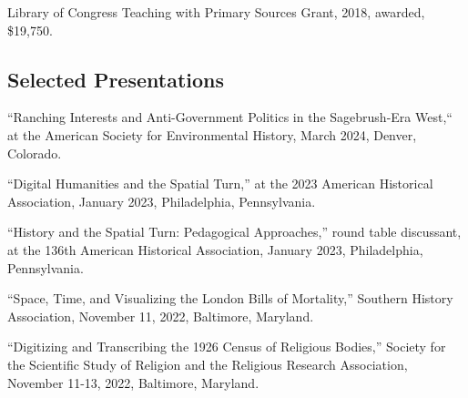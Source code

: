 \documentclass[10pt]{article}
\begin{document}
Library of Congress Teaching with Primary Sources Grant, 2018, awarded, \$19,750.

\subsection{Selected Presentations}\label{presentations}

``Ranching Interests and Anti-Government Politics in the Sagebrush-Era West,`` at the American Society for Environmental History, March 2024, Denver, Colorado.

``Digital Humanities and the Spatial Turn,'' at the 2023 American Historical Association, January 2023, Philadelphia, Pennsylvania.

``History and the Spatial Turn: Pedagogical Approaches,'' round table discussant, at the 136th American Historical Association, January 2023, Philadelphia, Pennsylvania.

``Space, Time, and Visualizing the London Bills of Mortality,'' Southern History Association, November 11, 2022, Baltimore, Maryland.

``Digitizing and Transcribing the 1926 Census of Religious Bodies,'' Society for the Scientific Study of Religion and the Religious Research Association, November 11-13, 2022, Baltimore, Maryland.
\end{document}
